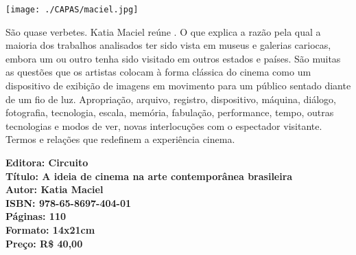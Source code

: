\pagestyle{circuito}
\label{circuito}




\begin{center}
\hspace*{.5cm}\texttt{[image: ./CAPAS/maciel.jpg]}
\end{center}

\hspace*{-7cm}\hrulefill\hspace*{-7cm}

\medskip

\noindent{}São quase verbetes. Katia Maciel reúne . O que explica a
razão pela qual a maioria dos trabalhos analisados ter sido vista em museus
e galerias cariocas, embora um ou outro tenha sido visitado em outros
estados e países. São muitas as questões que os artistas colocam à forma
clássica do cinema como um dispositivo de exibição de imagens em
movimento para um público sentado diante de um fio de luz. Apropriação,
arquivo, registro, dispositivo, máquina, diálogo, fotografia, tecnologia, escala,
memória, fabulação, performance, tempo, outras tecnologias e modos de ver,
novas interlocuções com o espectador visitante. Termos e relações que
redefinem a experiência cinema.

\vfill

\hspace*{-.4cm}\begin{minipage}[c]{1\linewidth}
\small\textbf{
\hspace*{-.1cm}Editora: Circuito\\
Título: A ideia de cinema na arte contemporânea brasileira\\
Autor: Katia Maciel\\ 
ISBN: 978-65-8697-404-01\\
Páginas: 110\\
Formato: 14x21cm\\
Preço: R\$ 40,00\\
}
\end{minipage}

